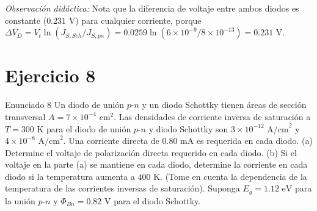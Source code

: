\documentclass[11pt,a4paper]{article}
\begin{document}
\begin{respuestabox}
\begin{center}
%
\end{center}
\textit{Observación didáctica:} Nota que la diferencia de voltaje entre ambos diodos es constante ($0.231\text{ V}$) para cualquier corriente, porque $\Delta V_D = V_t \ln(J_{S,Sch}/J_{S,pn}) = 0.0259 \ln(6\times 10^{-9} / 8\times 10^{-13}) = 0.231\text{ V}$.
\end{respuestabox}

\newpage

\section*{Ejercicio 8}
\begin{ejerciciobox}{Enunciado 8}
Un diodo de unión $p$-$n$ y un diodo Schottky tienen áreas de sección transversal $A = 7 \times 10^{-4}\text{ cm}^2$. Las densidades de corriente inversa de saturación a $T = 300\text{ K}$ para el diodo de unión $p$-$n$ y diodo Schottky son $3 \times 10^{-12}\text{ A/cm}^2$ y $4 \times 10^{-8}\text{ A/cm}^2$. Una corriente directa de $0.80\text{ mA}$ es requerida en cada diodo. (a) Determine el voltaje de polarización directa requerido en cada diodo. (b) Si el voltaje en la parte (a) se mantiene en cada diodo, determine la corriente en cada diodo si la temperatura aumenta a $400\text{ K}$. (Tome en cuenta la dependencia de la temperatura de las corrientes inversas de saturación). Suponga $E_g = 1.12\text{ eV}$ para la unión $p$-$n$ y $\Phi_{Bn} = 0.82\text{ V}$ para el diodo Schottky.
\end{ejerciciobox}
\end{document}
